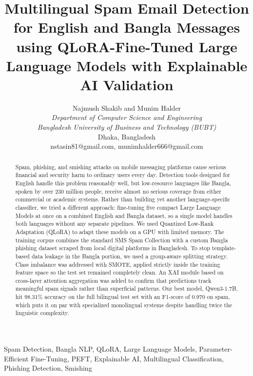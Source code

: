 \documentclass[journal]{IEEEtran}
\begin{document}
\frenchspacing

\title{Multilingual Spam Email Detection for English and Bangla Messages using QLoRA-Fine-Tuned Large Language Models with Explainable AI Validation}

\author{Najmush Shakib and Munim Halder \\
\textit{Department of Computer Science and Engineering} \\
\textit{Bangladesh University of Business and Technology (BUBT)} \\
Dhaka, Bangladesh \\
nstasin81@gmail.com, munimhalder666@gmail.com
}

\maketitle

\begin{abstract}
Spam, phishing, and smishing attacks on mobile messaging platforms cause serious financial and security harm to ordinary users every day. Detection tools designed for English handle this problem reasonably well, but low-resource languages like Bangla, spoken by over 230 million people, receive almost no serious coverage from either commercial or academic systems. Rather than building yet another language-specific classifier, we tried a different approach: fine-tuning five compact Large Language Models at once on a combined English and Bangla dataset, so a single model handles both languages without any separate pipelines. We used Quantized Low-Rank Adaptation (QLoRA) to adapt these models on a GPU with limited memory. The training corpus combines the standard SMS Spam Collection with a custom Bangla phishing dataset scraped from local digital platforms in Bangladesh. To stop template-based data leakage in the Bangla portion, we used a group-aware splitting strategy. Class imbalance was addressed with SMOTE, applied strictly inside the training feature space so the test set remained completely clean. An XAI module based on cross-layer attention aggregation was added to confirm that predictions track meaningful spam signals rather than superficial patterns. Our best model, Qwen3-1.7B, hit 98.31\% accuracy on the full bilingual test set with an F1-score of 0.970 on spam, which puts it on par with specialized monolingual systems despite handling twice the linguistic complexity.
\end{abstract}

\begin{IEEEkeywords}
Spam Detection, Bangla NLP, QLoRA, Large Language Models, Parameter-Efficient Fine-Tuning, PEFT, Explainable AI, Multilingual Classification, Phishing Detection, Smishing
\end{IEEEkeywords}
\end{document}
